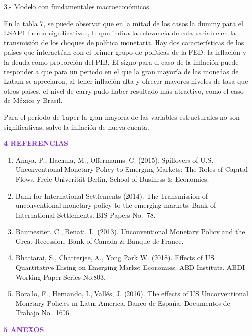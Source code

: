 \documentclass[
  9.5pt,
]{article}
\providecommand{\tightlist}{%
  \setlength{\itemsep}{0pt}\setlength{\parskip}{0pt}}
\begin{document}
3.- Modelo con fundamentales macroeconómicos

En la tabla 7, se puede observar que en la mitad de los casos la dummy
para el LSAP1 fueron significativos, lo que indica la relevancia de esta
variable en la transmisión de los choques de política monetaria. Hay dos
características de los países que interactúan con el primer grupo de
políticas de la FED: la inflación y la deuda como proporción del PIB. El
signo para el caso de la inflación puede responder a que para un periodo
en el que la gran mayoría de las monedas de Latam se apreciaron, al
tener inflación alta y ofrecer mayores niveles de tasa que otros países,
el nivel de carry pudo haber resultado más atractivo, como el caso de
México y Brasil.

Para el periodo de Taper la gran mayoría de las variables estructurales
no son significativas, salvo la inflación de nueva cuenta.

\textbf{\textcolor{BlueViolet}{4   REFERENCIAS}}

\begin{enumerate}
\def\labelenumi{\arabic{enumi}.}
\tightlist
\item
  Anaya, P., Hachula, M., Offermanns, C. (2015). Spillovers of U.S.
  Unconventional Monetary Policy to Emerging Markets: The Roles of
  Capital Flows. Freie Univerität Berlin, School of Business \&
  Economics.
\item
  Bank for International Settlements (2014). The Transmission of
  unconventional monetary policy to the emerging markets. Bank of
  International Settlements. BIS Papers No.~78.
\item
  Baumesiter, C., Benati, L. (2013). Unconventional Monetary Policy and
  the Great Recession. Bank of Canada \& Banque de France.
\item
  Bhattarai, S., Chatterjee, A., Yong Park W. (2018). Effects of US
  Quantitative Easing on Emerging Market Economies. ABD Institute. ABDI
  Working Paper Series No.803.
\item
  Borallo, F., Hernando, I., Vallés, J. (2016). The effects of US
  Unconventional Monetary Policies in Latin America. Banco de España.
  Documentos de Trabajo No.~1606.
\end{enumerate}

\textbf{\textcolor{BlueViolet}{5   ANEXOS}}
\end{document}
